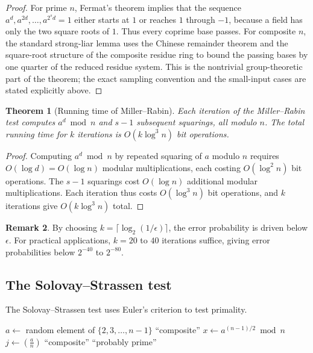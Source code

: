 \documentclass[twoside,12pt]{book}
\theoremstyle{plain}
\newtheorem{theorem}{Theorem}[chapter]
\theoremstyle{definition}
\newtheorem{remark}[theorem]{Remark}
\theoremstyle{remark}
\begin{document}
\begin{proof}
For prime $n$, Fermat's theorem implies that the sequence
$a^d,a^{2d},\ldots,a^{2^sd}=1$ either starts at $1$ or reaches $1$ through
$-1$, because a field has only the two square roots of $1$. Thus every
coprime base passes. For composite $n$, the standard strong-liar lemma uses
the Chinese remainder theorem and the square-root structure of the composite
residue ring to bound the passing bases by one quarter of the reduced residue
system. This is the nontrivial group-theoretic part of the theorem; the exact
sampling convention and the small-input cases are stated explicitly above.
\end{proof}

\begin{theorem}[Running time of Miller--Rabin]
\label{thm:mr-time}
Each iteration of the Miller--Rabin test computes $a^d \bmod n$ and $s-1$ subsequent squarings, all modulo $n$. The total running time for $k$ iterations is $O(k \log^3 n)$ bit operations.
\end{theorem}

\begin{proof}
Computing $a^d \bmod n$ by repeated squaring of $a$ modulo $n$ requires $O(\log d) = O(\log n)$ modular multiplications, each costing $O(\log^2 n)$ bit operations. The $s - 1$ squarings cost $O(\log n)$ additional modular multiplications. Each iteration thus costs $O(\log^3 n)$ bit operations, and $k$ iterations give $O(k \log^3 n)$ total.
\end{proof}

\begin{remark}
By choosing $k = \lceil \log_2(1/\epsilon) \rceil$, the error probability is driven below $\epsilon$. For practical applications, $k = 20$ to $40$ iterations suffice, giving error probabilities below $2^{-40}$ to $2^{-80}$.
\end{remark}

\subsection{The Solovay--Strassen test}

The Solovay--Strassen test uses Euler's criterion to test primality.

\begin{algorithm}
\caption{Solovay--Strassen Primality Test}
\label{alg:solovay-strassen}
\begin{algorithmic}[1]
 
        \State $a \gets$ random element of $\{2, 3, \ldots, n-1\}$
            \State \Return ``composite''
        \EndIf
        \State $x \gets a^{(n-1)/2} \bmod n$
        \State $j \gets \left(\frac{a}{n}\right)$ 
            \State \Return ``composite''
        \EndIf
    \EndFor
    \State \Return ``probably prime''
\EndFunction
\end{algorithmic}
\end{algorithm}
\end{document}
